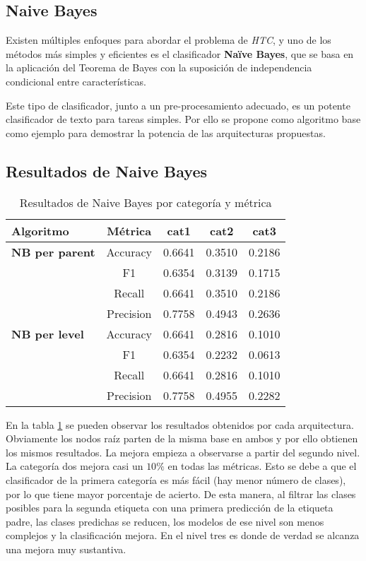 \documentclass[12pt,letterpaper]{article}
\begin{document}
\subsection{Naive Bayes}
Existen múltiples enfoques para abordar el problema de \textit{HTC}, y uno de los métodos más simples y eficientes es el clasificador \textbf{Naïve Bayes}, que se basa en la aplicación del Teorema de Bayes con la suposición de independencia condicional entre características.

Este tipo de clasificador, junto a un pre-procesamiento adecuado, es un potente clasificador de texto para tareas simples. Por ello se propone como algoritmo base como ejemplo para demostrar la potencia de las arquitecturas propuestas.

\subsection{Resultados de Naive Bayes}

\begin{table}[htp]
    \centering
    \begin{tabular}{lcccc}
        \toprule
        \textbf{Algoritmo} & \textbf{Métrica}   & \textbf{cat1} & \textbf{cat2} & \textbf{cat3} \\
        \midrule
        \textbf{NB per parent}  & Accuracy  & 0.6641  & 0.3510  & 0.2186  \\
                                & F1        & 0.6354  & 0.3139  & 0.1715  \\
                                & Recall    & 0.6641  & 0.3510  & 0.2186  \\
                                & Precision & 0.7758  & 0.4943  & 0.2636  \\
        \midrule
        \textbf{NB per level}   & Accuracy  & 0.6641  & 0.2816  & 0.1010  \\
                                & F1        & 0.6354  & 0.2232  & 0.0613  \\
                                & Recall    & 0.6641  & 0.2816  & 0.1010  \\
                                & Precision & 0.7758  & 0.4955  & 0.2282  \\
        \bottomrule
    \end{tabular}
    \caption{Resultados de Naive Bayes por categoría y métrica}
    \label{tab:nb-results}
\end{table}


En la tabla \ref{tab:nb-results} se pueden observar los resultados obtenidos por cada arquitectura. Obviamente los nodos raíz parten de la misma base en ambos y por ello obtienen los mismos resultados. La mejora empieza a observarse a partir del segundo nivel. La categoría dos mejora casi un $10\%$ en todas las métricas. Esto se debe a que el clasificador de la primera categoría es más fácil (hay menor número de clases), por lo que tiene mayor porcentaje de acierto. De esta manera, al filtrar las clases posibles para la segunda etiqueta con una primera predicción de la etiqueta padre, las clases predichas se reducen, los modelos de ese nivel son menos complejos y la clasificación mejora. En el nivel tres es donde de verdad se alcanza una mejora muy sustantiva.
\end{document}
